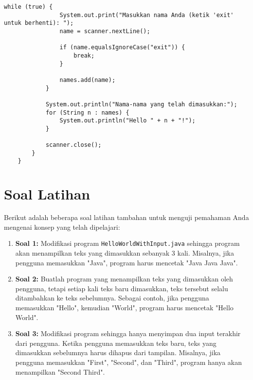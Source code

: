 \begin{enumerate}
\begin{lstlisting}[style=JavaStyle, caption={Latihan 5}]
			while (true) {
				System.out.print("Masukkan nama Anda (ketik 'exit' untuk berhenti): ");
				name = scanner.nextLine();
				
				if (name.equalsIgnoreCase("exit")) {
					break;
				}
				
				names.add(name);
			}
			
			System.out.println("Nama-nama yang telah dimasukkan:");
			for (String n : names) {
				System.out.println("Hello " + n + "!");
			}
			
			scanner.close();
		}
	}
\end{lstlisting}
\end{enumerate}

\section{Soal Latihan}

Berikut adalah beberapa soal latihan tambahan untuk menguji pemahaman Anda mengenai konsep yang telah dipelajari:

\begin{enumerate}
\item \textbf{Soal 1:} Modifikasi program \texttt{HelloWorldWithInput.java} sehingga program akan menampilkan teks yang dimasukkan sebanyak 3 kali. Misalnya, jika pengguna memasukkan "Java", program harus mencetak "Java Java Java".

\item \textbf{Soal 2:} Buatlah program yang menampilkan teks yang dimasukkan oleh pengguna, tetapi setiap kali teks baru dimasukkan, teks tersebut selalu ditambahkan ke teks sebelumnya. Sebagai contoh, jika pengguna memasukkan "Hello", kemudian "World", program harus mencetak "Hello World".

\item \textbf{Soal 3:} Modifikasi program sehingga hanya menyimpan dua input terakhir dari pengguna. Ketika pengguna memasukkan teks baru, teks yang dimasukkan sebelumnya harus dihapus dari tampilan. Misalnya, jika pengguna memasukkan "First", "Second", dan "Third", program hanya akan menampilkan "Second Third".
\end{enumerate}

